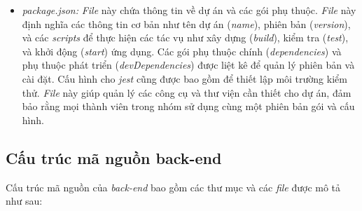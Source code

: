 \begin{itemize}
    \item \textit{package.json:} \textit{File} này chứa thông tin về dự án và các gói phụ thuộc. \textit{File} này định nghĩa các thông tin cơ bản như tên dự án (\textit{name}), phiên bản (\textit{version}), và các \textit{scripts} để thực hiện các tác vụ như xây dựng (\textit{build}), kiểm tra (\textit{test}), và khởi động (\textit{start}) ứng dụng. Các gói phụ thuộc chính (\textit{dependencies}) và phụ thuộc phát triển (\textit{devDependencies}) được liệt kê để quản lý phiên bản và cài đặt. Cấu hình cho \textit{jest} cũng được bao gồm để thiết lập môi trường kiểm thử. \textit{File} này giúp quản lý các công cụ và thư viện cần thiết cho dự án, đảm bảo rằng mọi thành viên trong nhóm sử dụng cùng một phiên bản gói và cấu hình.
\end{itemize}
\subsection{Cấu trúc mã nguồn back-end}
Cấu trúc mã nguồn của \textit{back-end} bao gồm các thư mục và các \textit{file} được mô tả như sau:
